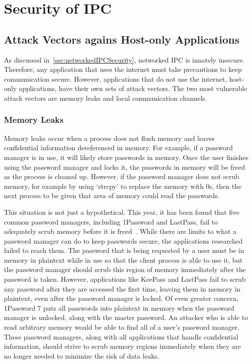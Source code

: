 \chapter{Security of IPC}
\label{sec:securityOfIPC}

\section{Attack Vectors agains Host-only Applications}
\label{sec:hostOnlyAttackVectors}
As discussed in~\ref{sec:networkedIPCSecurity}, networked IPC is innately insecure.  Therefore, any application that uses the internet must take precautions to keep communication secure.  However, applications that do not use the internet, host-only applications, have their own sets of attack vectors.  The two most vulnerable attack vectors are memory leaks and local communication channels.

\subsection{Memory Leaks}
\label{sec:memoryLeaks}
Memory leaks occur when a process does not flush memory and leaves confidential information dereferenced in memory.  For example, if a password manager is in use, it will likely store passwords in memory.  Once the user finishes using the password manager and locks it, the passwords in memory will be freed as the process is cleaned up.  However, if the password manager does not scrub memory, for example by using `strcpy' to replace the memory with 0s, then the next process to be given that area of memory could read the passwords.

This situation is not just a hypothetical.  This year, it has been found that five common password managers, including 1Password and LastPass, fail to adequately scrub memory before it is freed~\cite{independent_security_evaluators_2019}.  While there are limits to what a password manager can do to keep passwords secure, the applications researched failed to reach them.  The password that is being requested by a user must be in memory in plaintext while in use so that the client process is able to use it, but the password manager should scrub this region of memory immediately after the password is taken.  However, applications like KeePass and LastPass fail to scrub any password after they are accessed the first time, leaving them in memory in plaintext, even after the password manager is locked.  Of even greater concern, 1Password 7 puts all passwords into plaintext in memory when the password manager is unlocked, along with the master password.  An attacker who is able to read arbitrary memory would be able to find all of a user's password manager.  These password managers, along with all applications that handle confidential information, should strive to scrub memory regions immediately when they are no longer needed to minimize the risk of data leaks.

